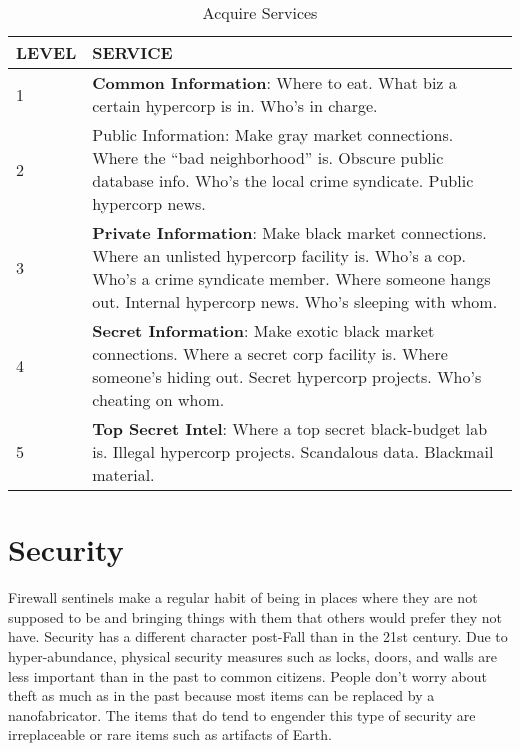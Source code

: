 \begin{table} \caption{Acquire Services} \begin{tabularx}{\textwidth}{|l|X|} \hline

LEVEL &SERVICE \\ \hline

1 &\textbf{Common Information}: Where to eat. What biz a certain hypercorp is in. Who’s in charge. \\ \hline

2 &Public Information: Make gray market connections. Where the “bad neighborhood” is. Obscure public database info. Who’s the local crime syndicate. Public hypercorp news. \\ \hline

3 &\textbf{Private Information}: Make black market connections. Where an unlisted hypercorp facility is. Who’s a cop. Who’s a crime syndicate member. Where someone hangs out. Internal hypercorp news. Who’s sleeping with whom. \\ \hline

4 &\textbf{Secret Information}: Make exotic black market connections. Where a secret corp facility is. Where someone’s hiding out. Secret hypercorp projects. Who’s cheating on whom. \\ \hline

5 &\textbf{Top Secret Intel}: Where a top secret black-budget lab is. Illegal hypercorp projects. Scandalous data. Blackmail material. \\ \hline

\end{tabularx} \end{table} 







\section{Security} 

Firewall sentinels make a regular habit of being in places where they are not supposed to be and bringing things with them that others would prefer they not have. Security has a different character post-Fall than in the 21st century. Due to hyper-abundance, physical security measures such as locks, doors, and walls are less important than in the past to common citizens. People don't worry about theft as much as in the past because most items can be replaced by a nanofabricator. The items that do tend to engender this type of security are irreplaceable or rare items such as artifacts of Earth. 

